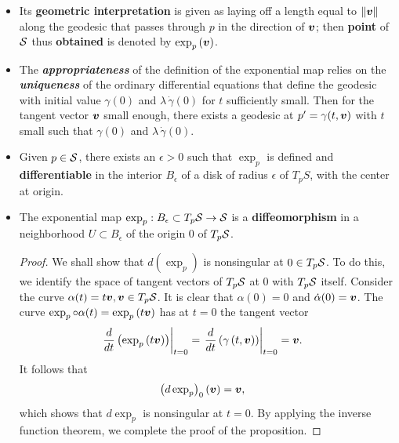 \documentclass[11pt]{article}
\begin{document}
\begin{itemize}
\item Its \textbf{geometric interpretation} is given as laying off a length equal to $\left\|\boldsymbol{v}\right\|_{}$ along the geodesic that passes through $p$ in the direction of $\boldsymbol{v}$; then \textbf{point} of ${\mathcal S}$ thus \textbf{obtained} is denoted by $\exp_{p}\left(\boldsymbol{v}\right)$. 


\item The \emph{\textbf{appropriateness}} of the definition of the exponential map relies on the \textbf{\emph{uniqueness}} of the ordinary differential equations that define the geodesic with initial value $\gamma(0)$ and $\lambda\,\dot{\gamma}(0)$ for $t$ sufficiently small. Then for the tangent vector $\boldsymbol{v}$ small enough, there exists a geodesic at $p'= \gamma(t,\boldsymbol{v})$ with $t$ small such that $\gamma(0)$ and $\lambda\,\dot{\gamma}(0)$.

\item  \begin{proposition}\label{prop: exp_map_diff}
Given $p\in {\mathcal S}$, there exists an $\epsilon>0$ such that $\exp_{p}$ is defined and \textbf{differentiable} in the interior $B_{\epsilon}$ of a disk of radius $\epsilon$ of $T_{p}S$, with the center at origin. 
\end{proposition}

\item  \begin{proposition}\label{prop: exp_map_diffeomorph}
The exponential map $\exp_{p}: B_{\epsilon}\subset T_{p}{\mathcal S} \rightarrow {\mathcal S}$ is a \textbf{diffeomorphism} in a neighborhood $U\subset B_{\epsilon}$ of the origin $0$ of $T_{p}{\mathcal S}$. 
\end{proposition}
\begin{proof}
We shall show that $d(\exp_{p})$ is nonsingular at $0\in T_{p}{\mathcal S}$. To do this, we identify the space of tangent vectors of $T_{p}{\mathcal S}$ at $0$ with $T_{p}{\mathcal S}$ itself. Consider the curve $\alpha(t) = t\boldsymbol{v}, \boldsymbol{v}\in T_{p}{\mathcal S}$. It is clear that $\alpha(0) = 0$ and $\dot{\alpha}(0) = \boldsymbol{v}$. The curve $\exp_{p}\circ \alpha (t) = \exp_{p}\left(t\boldsymbol{v}\right)$ has at $t=0$ the tangent vector 
\begin{align*}
\left.{\frac{d}{dt}\left(\exp_{p}\left(t\boldsymbol{v}\right)\right)}\right\vert_{t=0} &= \left.{\frac{d}{dt}\left(\gamma\left(t, \boldsymbol{v}\right)\right)}\right\vert_{t=0} = \boldsymbol{v}.
\end{align*}
It follows that 
\begin{align*}
\left(d\exp_{p}\right)_{0}(\boldsymbol{v}) &= \boldsymbol{v},
\end{align*}
which shows that $d\exp_{p}$ is nonsingular at $t=0$. By applying the inverse function theorem, we complete the proof of the proposition. \QEDA 
\end{proof}
\end{itemize}
\end{document}
